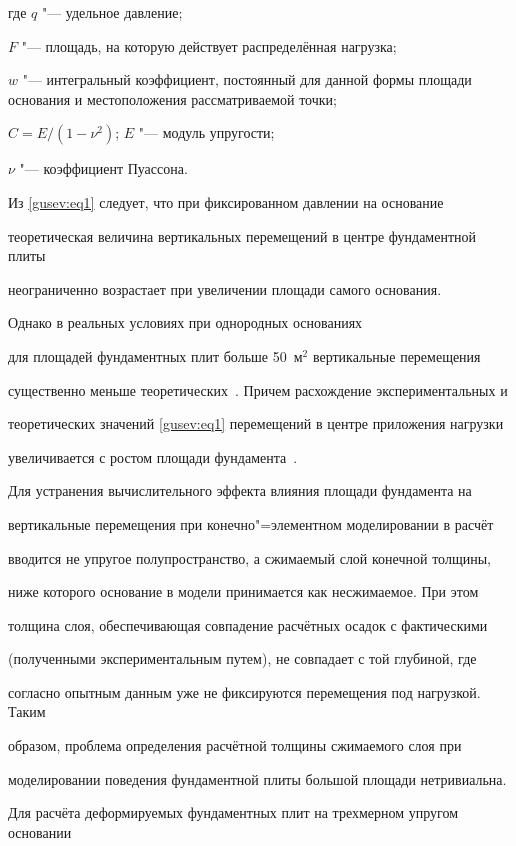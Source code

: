 где $q$ "--- удельное давление; 

$F$ "--- площадь, на которую действует распределённая нагрузка;

$w$ "--- интегральный коэффициент, постоянный для данной формы площади основания и местоположения рассматриваемой точки; 

$C=E/(1-\nu^2)$; $E$ "--- модуль упругости;

$\nu $ "--- коэффициент Пуассона.



Из \eqref{gusev:eq1} следует, что при фиксированном давлении на основание

теоретическая величина вертикальных перемещений в центре фундаментной плиты

неограниченно возрастает при увеличении площади самого основания.



Однако в реальных условиях при однородных основаниях

для площадей фундаментных плит больше 50~м$^2$ вертикальные перемещения

существенно меньше теоретических~\cite{gusev:bib1}. Причем расхождение экспериментальных и

теоретических значений \eqref{gusev:eq1} перемещений в центре приложения нагрузки

увеличивается с ростом площади фундамента~\cite{gusev:bib1}.



Для устранения вычислительного эффекта влияния площади фундамента на

вертикальные перемещения при конечно"=элементном моделировании в расчёт

вводится не упругое полупространство, а сжимаемый слой конечной толщины,

ниже которого основание в модели принимается как несжимаемое. При этом

толщина слоя, обеспечивающая совпадение расчётных осадок с фактическими

(полученными экспериментальным путем), не совпадает с той глубиной, где

согласно опытным данным уже не фиксируются перемещения под нагрузкой. Таким

образом, проблема определения расчётной толщины сжимаемого слоя при

моделировании поведения фундаментной плиты большой площади нетривиальна.



Для расчёта деформируемых фундаментных плит на трехмерном упругом основании

